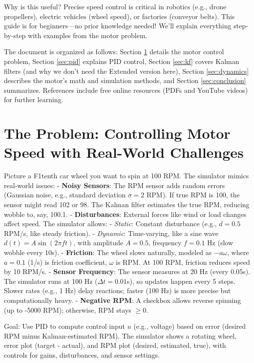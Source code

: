 \documentclass[conference]{IEEEtran}
\begin{document}
	Why is this useful? Precise speed control is critical in robotics (e.g., drone propellers), electric vehicles (wheel speed), or factories (conveyor belts). This guide is for beginners—no prior knowledge needed! We'll explain everything step-by-step with examples from the motor problem.
	
	The document is organized as follows: Section \ref{sec:problem} details the motor control problem, Section \ref{sec:pid} explains PID control, Section \ref{sec:kf} covers Kalman filters (and why we don't need the Extended version here), Section \ref{sec:dynamics} describes the motor's math and simulation methods, and Section \ref{sec:conclusion} summarizes. References include free online resources (PDFs and YouTube videos) for further learning.
	
	\section{The Problem: Controlling Motor Speed with Real-World Challenges}
	\label{sec:problem}
	Picture a F1tenth car wheel you want to spin at 100 RPM. The simulator mimics real-world issues:
	- \textbf{Noisy Sensors}: The RPM sensor adds random errors (Gaussian noise, e.g., standard deviation $\sigma=2$ RPM). If true RPM is 100, the sensor might read 102 or 98. The Kalman filter estimates the true RPM, reducing wobble to, say, 100.1.
	- \textbf{Disturbances}: External forces like wind or load changes affect speed. The simulator allows:
	- \textit{Static}: Constant disturbance (e.g., $d=0.5$ RPM/s, like steady friction).
	- \textit{Dynamic}: Time-varying, like a sine wave $d(t) = A \sin(2\pi f t)$, with amplitude $A=0.5$, frequency $f=0.1$ Hz (slow wobble every 10s).
	- \textbf{Friction}: The wheel slows naturally, modeled as $-a \omega$, where $a=0.1$ (1/s) is friction coefficient, $\omega$ is RPM. At 100 RPM, friction reduces speed by 10 RPM/s.
	- \textbf{Sensor Frequency}: The sensor measures at 20 Hz (every 0.05s). The simulator runs at 100 Hz ($\Delta t=0.01$s), so updates happen every 5 steps. Slower rates (e.g., 1 Hz) delay reactions; faster (100 Hz) is more precise but computationally heavy.
	- \textbf{Negative RPM}: A checkbox allows reverse spinning (up to -5000 RPM); otherwise, RPM stays $\geq 0$.
	
	Goal: Use PID to compute control input $u$ (e.g., voltage) based on error (desired RPM minus Kalman-estimated RPM). The simulator shows a rotating wheel, error plot (target - actual), and RPM plot (desired, estimated, true), with controls for gains, disturbances, and sensor settings.
	
\end{document}
